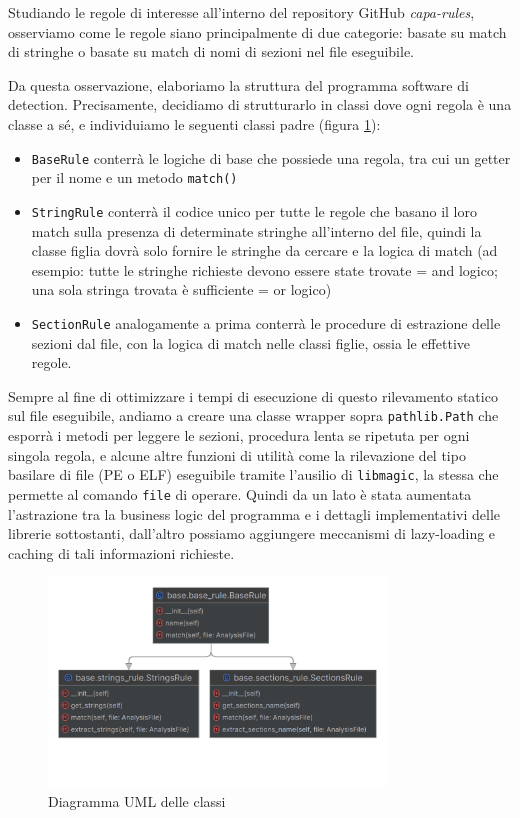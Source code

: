 Studiando le regole di interesse all'interno del repository GitHub \textit{capa-rules}, osserviamo come le regole siano principalmente di due categorie: basate su match di stringhe o basate su match di nomi di sezioni nel file eseguibile.

Da questa osservazione, elaboriamo la struttura del programma software di detection. Precisamente, decidiamo di strutturarlo in classi dove ogni regola è una classe a sé, e individuiamo le seguenti classi padre (figura \ref{fig:base_custom_static_analyzer_uml}):
\begin{itemize}
    \item \texttt{BaseRule} conterrà le logiche di base che possiede una regola, tra cui un getter per il nome e un metodo \texttt{match()}
    \item \texttt{StringRule} conterrà il codice unico per tutte le regole che basano il loro match sulla presenza di determinate stringhe all'interno del file, quindi la classe figlia dovrà solo fornire le stringhe da cercare e la logica di match (ad esempio: tutte le stringhe richieste devono essere state trovate = and logico; una sola stringa trovata è sufficiente = or logico)
    \item \texttt{SectionRule} analogamente a prima conterrà le procedure di estrazione delle sezioni dal file, con la logica di match nelle classi figlie, ossia le effettive regole.
\end{itemize}

Sempre al fine di ottimizzare i tempi di esecuzione di questo rilevamento statico sul file eseguibile,
andiamo a creare una classe wrapper sopra \texttt{pathlib.Path} che esporrà i metodi per leggere le sezioni, procedura lenta se ripetuta per ogni singola regola, e alcune altre funzioni di utilità come la rilevazione del tipo basilare di file (PE o ELF) eseguibile tramite l'ausilio di \texttt{libmagic}, la stessa che permette al comando \texttt{file} di operare.
Quindi da un lato è stata aumentata l'astrazione tra la business logic del programma e i dettagli implementativi delle librerie sottostanti, dall'altro possiamo aggiungere meccanismi di lazy-loading e caching di tali informazioni richieste.

\begin{figure}[h!]
    \centering
    \includegraphics[width = 0.8\textwidth]{assets/base_custom_static_analyzer.png}
    \caption{Diagramma UML delle classi}
    \label{fig:base_custom_static_analyzer_uml}
\end{figure}


